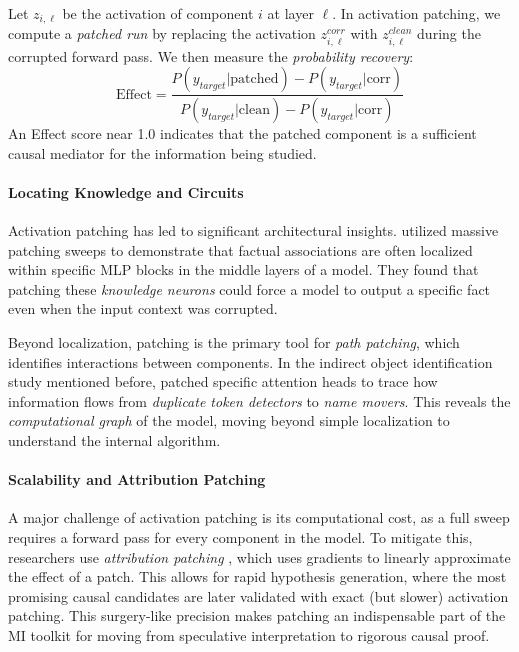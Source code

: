 Let $z_{i, \ell}$ be the activation of component $i$ at layer $\ell$. In activation patching, we compute a \emph{patched run} by replacing the activation $z^{corr}_{i, \ell}$ with $z^{clean}_{i, \ell}$ during the corrupted forward pass. We then measure the \emph{probability recovery}:
\begin{equation}
    \text{Effect} = \frac{P(y_{target} | \text{patched}) - P(y_{target} | \text{corr})}{P(y_{target} | \text{clean}) - P(y_{target} | \text{corr})}
\end{equation}
An Effect score near 1.0 indicates that the patched component is a sufficient causal mediator for the information being studied.


\paragraph{Locating Knowledge and Circuits}
Activation patching has led to significant architectural insights. \citet{meng2022locating} utilized massive patching sweeps to demonstrate that factual associations are often localized within specific MLP blocks in the middle layers of a model. They found that patching these \emph{knowledge neurons} could force a model to output a specific fact even when the input context was corrupted.

Beyond localization, patching is the primary tool for \emph{path patching}, which identifies interactions between components. In the indirect object identification study mentioned before, \citet{wang2022interpretability} patched specific attention heads to trace how information flows from {\em duplicate token detectors} to {\em name movers}. This reveals the \emph{computational graph} of the model, moving beyond simple localization to understand the internal algorithm.

\paragraph{Scalability and Attribution Patching}
A major challenge of activation patching is its computational cost, as a full sweep requires a forward pass for every component in the model. To mitigate this, researchers use \emph{attribution patching} \citep{syed2024attribution}, which uses gradients to linearly approximate the effect of a patch. This allows for rapid hypothesis generation, where the most promising causal candidates are later validated with exact (but slower) activation patching. This surgery-like precision makes patching an indispensable part of the MI toolkit for moving from speculative interpretation to rigorous causal proof.


